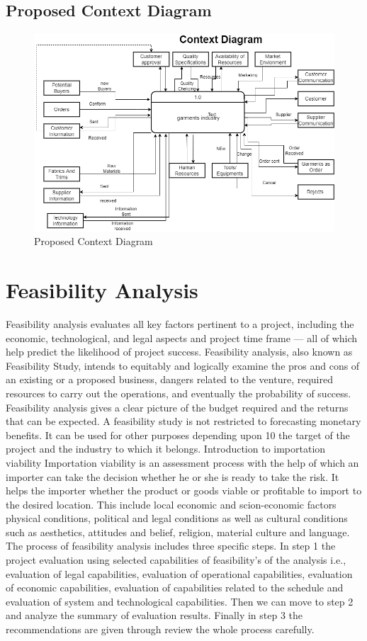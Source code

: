 \documentclass{article}
\begin{document}
\subsection{Proposed Context Diagram}
\begin{figure}[h]
    \centering
    \includegraphics[width=13 cm]{img/contextdiag.png}
    \caption{Proposed Context Diagram}
    \label{fig:my_label}
\end{figure}
\newpage
\newpage
\section{Feasibility Analysis}
 Feasibility analysis evaluates all key factors pertinent to a project, including the economic, technological, and legal aspects and project time frame — all of which help predict the likelihood of project success. Feasibility analysis, also known as Feasibility Study, intends to equitably and logically examine the pros and cons of an existing or a proposed business, dangers related to the venture, required resources to carry out the operations, and eventually the probability of success. Feasibility analysis gives a clear picture of the budget required and the returns that can be expected. A feasibility study is not restricted to forecasting monetary benefits. It can be used for other purposes depending upon 10 the target of the project and the industry to which it belongs. Introduction to importation viability Importation viability is an assessment process with the help of which an importer can take the decision whether he or she is ready to take the risk. It helps the importer whether the product or goods viable or profitable to import to the desired location. This include local economic and scion-economic factors physical conditions, political and legal conditions as well as cultural conditions such as aesthetics, attitudes and belief, religion, material culture and language. The process of feasibility analysis includes three specific steps. In step 1 the project evaluation using selected capabilities of feasibility’s of the analysis i.e., evaluation of legal capabilities, evaluation of operational capabilities, evaluation of economic capabilities, evaluation of capabilities related to the schedule and evaluation of system and technological capabilities. Then we can move to step 2 and analyze the summary of evaluation results. Finally in step 3 the recommendations are given through review the whole process carefully.
\end{document}

